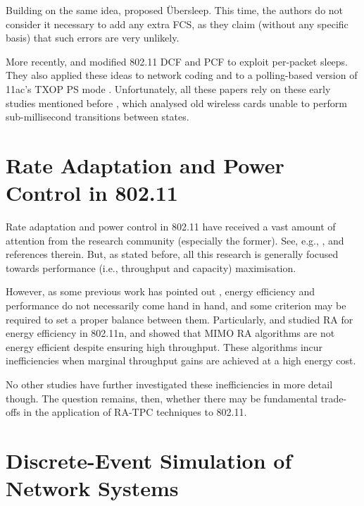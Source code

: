 \documentclass[twoside,nohyper]{tufte-book}
\begin{document}
Building on the same idea, \citet{Prasad2014} proposed Übersleep. This time, the authors do not consider it necessary to add any extra FCS, as they claim (without any specific basis) that such errors are very unlikely.

More recently, \citet{palacios2013a} and \citet{palacios2013b} modified 802.11 DCF and PCF to exploit per-packet sleeps. They also applied these ideas to network coding \citep{palacios2015b} and to a polling-based version of 11ac's TXOP PS mode \citep{palacios2015a}. Unfortunately, all these papers rely on these early studies mentioned before \citep{kamerman1997, havinga2000, jung2002}, which analysed old wireless cards unable to perform sub-millisecond transitions between states.

\hypertarget{rate-adaptation-and-power-control-in-802.11-1}{%
\section{Rate Adaptation and Power Control in 802.11}\label{rate-adaptation-and-power-control-in-802.11-1}}

Rate adaptation and power control in 802.11 have received a vast amount of attention from the research community (especially the former). See, e.g., \citet{biaz2008}, \citet{h-rca} and references therein. But, as stated before, all this research is generally focused towards performance (i.e., throughput and capacity) maximisation.

However, as some previous work has pointed out \citep{tradeoff, balancing}, energy efficiency and performance do not necessarily come hand in hand, and some criterion may be required to set a proper balance between them. Particularly, \citet{Li2012} and \citet{khan2013} studied RA for energy efficiency in 802.11n, and showed that MIMO RA algorithms are not energy efficient despite ensuring high throughput. These algorithms incur inefficiencies when marginal throughput gains are achieved at a high energy cost.

No other studies have further investigated these inefficiencies in more detail though. The question remains, then, whether there may be fundamental trade-offs in the application of RA-TPC techniques to 802.11.

\hypertarget{discrete-event-simulation-of-network-systems}{%
\section{Discrete-Event Simulation of Network Systems}\label{discrete-event-simulation-of-network-systems}}
\end{document}
